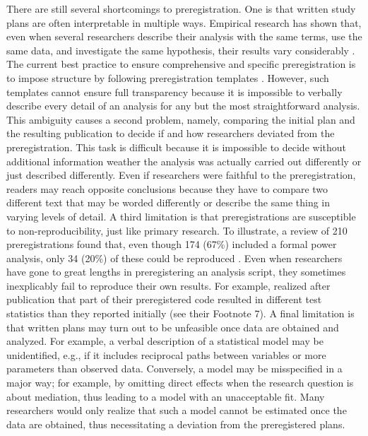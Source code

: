 \documentclass[psych,tutorial,submit,moreauthors,pdftex]{mdpi}
\begin{document}
There are still several shortcomings to preregistration. One is that
written study plans are often interpretable in multiple ways. Empirical
research has shown that, even when several researchers describe their
analysis with the same terms, use the same data, and investigate the
same hypothesis, their results vary considerably
\citep{silberzahnManyAnalystsOne2018}. The current best practice to
ensure comprehensive and specific preregistration is to impose structure
by following preregistration templates
\citep{bowmanOSFPreregTemplate2020, bakkerEnsuringQualitySpecificity2020}.
However, such templates cannot ensure full transparency because it is
impossible to verbally describe every detail of an analysis for any but
the most straightforward analysis. This ambiguity causes a second
problem, namely, comparing the initial plan and the resulting
publication to decide if and how researchers deviated from the
preregistration. This task is difficult because it is impossible to
decide without additional information weather the analysis was actually
carried out differently or just described differently. Even if
researchers were faithful to the preregistration, readers may reach
opposite conclusions because they have to compare two different text
that may be worded differently or describe the same thing in varying
levels of detail. A third limitation is that preregistrations are
susceptible to non-reproducibility, just like primary research. To
illustrate, a review of 210 preregistrations found that, even though 174
(67\%) included a formal power analysis, only 34 (20\%) of these could
be reproduced \citep{bakkerRecommendationsPreregistrationsInternal2020}.
Even when researchers have gone to great lengths in preregistering an
analysis script, they sometimes inexplicably fail to reproduce their own
results. For example, \citet{steegenMeasuringCrowdAgain2014} realized
after publication that part of their preregistered code resulted in
different test statistics than they reported initially (see their
Footnote 7). A final limitation is that written plans may turn out to be
unfeasible once data are obtained and analyzed. For example, a verbal
description of a statistical model may be unidentified, e.g., if it
includes reciprocal paths between variables or more parameters than
observed data. Conversely, a model may be misspecified in a major way;
for example, by omitting direct effects when the research question is
about mediation, thus leading to a model with an unacceptable fit. Many
researchers would only realize that such a model cannot be estimated
once the data are obtained, thus necessitating a deviation from the
preregistered plans.
\end{document}
